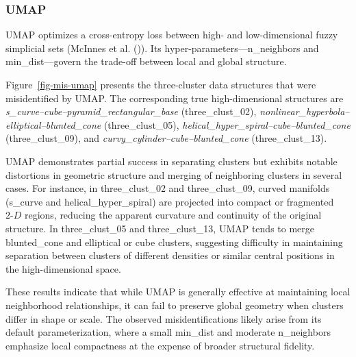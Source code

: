\documentclass[
  11pt,
  a4paper,
]{report}
\newcommand\gD{$2\text{-}D$}
\begin{document}
\begin{table}
\centering
{}
\end{table}

\subsubsection{UMAP}\label{umap}

UMAP optimizes a cross-entropy loss between high- and low-dimensional
fuzzy simplicial sets (McInnes et al.
()). Its hyper-parameters---n\_neighbors
and min\_dist---govern the trade-off between local and global structure.

Figure~\ref{fig-mis-umap} presents the three-cluster data structures
that were misidentified by UMAP. The corresponding true high-dimensional
structures are \emph{s\_curve--cube--pyramid\_rectangular\_base}
(three\_clust\_02),
\emph{nonlinear\_hyperbola--elliptical--blunted\_cone}
(three\_clust\_05), \emph{helical\_hyper\_spiral--cube--blunted\_cone}
(three\_clust\_09), and \emph{curvy\_cylinder--cube--blunted\_cone}
(three\_clust\_13).

UMAP demonstrates partial success in separating clusters but exhibits
notable distortions in geometric structure and merging of neighboring
clusters in several cases. For instance, in three\_clust\_02 and
three\_clust\_09, curved manifolds (s\_curve and helical\_hyper\_spiral)
are projected into compact or fragmented \gD{} regions, reducing the
apparent curvature and continuity of the original structure. In
three\_clust\_05 and three\_clust\_13, UMAP tends to merge blunted\_cone
and elliptical or cube clusters, suggesting difficulty in maintaining
separation between clusters of different densities or similar central
positions in the high-dimensional space.

These results indicate that while UMAP is generally effective at
maintaining local neighborhood relationships, it can fail to preserve
global geometry when clusters differ in shape or scale. The observed
misidentifications likely arise from its default parameterization, where
a small min\_dist and moderate n\_neighbors emphasize local compactness
at the expense of broader structural fidelity.
\end{document}
